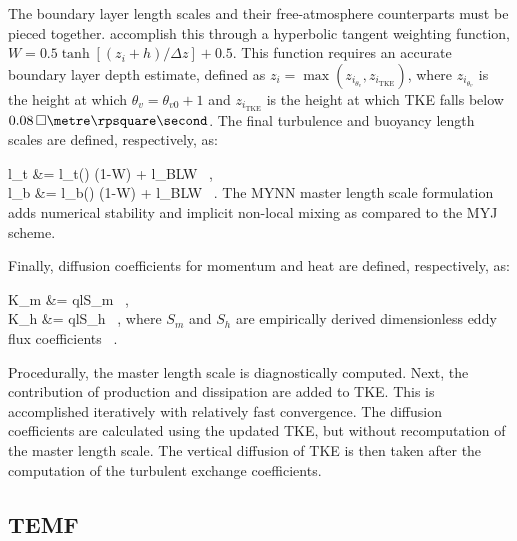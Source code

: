 The boundary layer length scales and their free-atmosphere counterparts must be pieced together.  \citet{OlsonBrown2011} accomplish this through a hyperbolic tangent weighting function, $W = 0.5 \tanh [ (z_i + h) / \Delta z] + 0.5$. This function requires an accurate boundary layer depth estimate, defined as $z_i = \max \left(z_{i_{\theta_v}},z_{i_{\mathrm{TKE}}}\right)$, where $ z_{i_{\theta_v}}$ is the height at which $\theta_v = \theta_{v0} +1$ and $z_{i_{\mathrm{TKE}}}$ is the height at which TKE falls below $0.08\, \square\metre \rpsquare\second$. The final turbulence and buoyancy length scales are defined, respectively, as:


\bse \label{equation354}
\bal
l_t &= l_{t()} (1-W) + l_{BL}W \, ,\label{equation354a} \\
l_b &= l_{b()} (1-W) + l_{BL}W \label{equation354b} \, .
\eal
\ese
\noindent
 The MYNN master length scale formulation adds numerical stability and implicit non-local mixing as compared to the MYJ scheme.

Finally, diffusion coefficients for momentum and heat are defined, respectively, as:

\bse \label{equation355}
\bal
K_m &= qlS_m \label{equation355a} \, ,\\
K_h &= qlS_h \label{equation355b} \, ,
\eal
\ese
\noindent
 where $S_m$ and $S_h$ are empirically derived dimensionless eddy flux coefficients ~\citep{HL1988}.

Procedurally, the master length scale is diagnostically computed. Next, the contribution of production and dissipation are added to TKE. This is accomplished iteratively with relatively fast convergence. The diffusion coefficients are calculated using the updated TKE, but without recomputation of the master length scale. The vertical diffusion of TKE is then taken after the computation of the turbulent exchange coefficients. 

\subsection{TEMF}
\label{pbl-temf-364}

